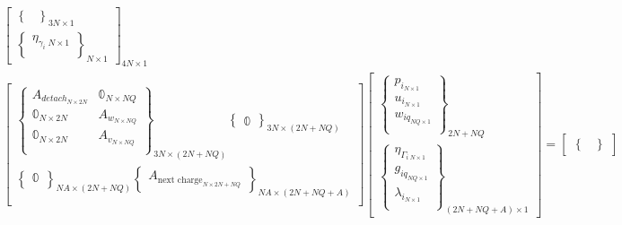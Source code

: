 \documentclass[conference]{IEEEtran}
\begin{document}
\begin{equation}
\begin{array}{c}
\begin{bmatrix}
\begin{Bmatrix}
    \end{Bmatrix}_{3N \times 1} \\
    \begin{Bmatrix}
        \eta_{\gamma_{i}\; N \times 1} \\
    \end{Bmatrix}_{N \times 1}
\end{bmatrix}_{4N \times 1} \\
\begin{bmatrix}
    \begin{Bmatrix}
        A_{detach_{N \times 2N}}    & \mathbb{0}_{N \times NQ} \\
        \mathbb{0}_{N \times 2N} & A_{w_{N \times NQ}}          \\
        \mathbb{0}_{N \times 2N} & A_{v_{N \times NQ}}          \\
    \end{Bmatrix}_{3N \times (2N + NQ)}
    \begin{Bmatrix}
        \mathbb{0}
    \end{Bmatrix}_{3N \times (2N + NQ)} \\
    \begin{Bmatrix}
        \mathbb{0}_{}
    \end{Bmatrix}_{NA \times (2N + NQ)}
    \begin{Bmatrix}
        A_{\textrm{next charge}_{N \times 2N + NQ}}
    \end{Bmatrix}_{NA \times (2N + NQ + A)} \\
\end{bmatrix}
\begin{bmatrix}
    \begin{Bmatrix}
        p_{i_{N \times 1}} \\
        u_{i_{N \times 1}} \\
        w_{iq_{NQ \times 1}} \\
    \end{Bmatrix}_{2N + NQ} \\
    \begin{Bmatrix}
        \eta_{\Gamma_{i\; N \times 1}} \\
        g_{iq_{NQ \times 1}}           \\
        \lambda_{i_{N \times 1}}       \\
    \end{Bmatrix}_{(2N + NQ + A) \times 1}
\end{bmatrix}
=
\begin{bmatrix}
    \begin{Bmatrix}

\end{Bmatrix}
\end{bmatrix}
\end{array}
\end{equation}
\end{document}
